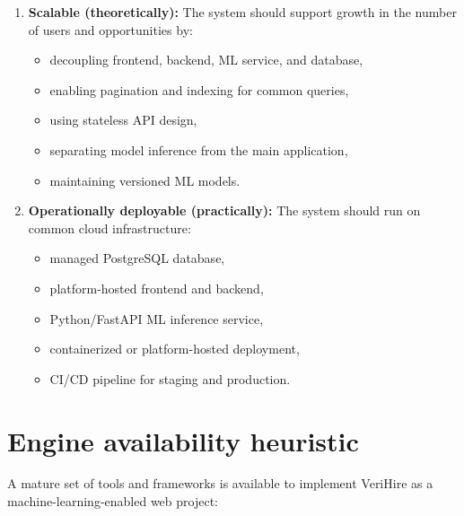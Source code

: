 \documentclass[11pt,a4paper]{article}
\begin{document}
\begin{enumerate}[leftmargin=0.7cm]

    \item \textbf{Scalable (theoretically):} The system should support growth
    in the number of users and opportunities by:

    \begin{itemize}[leftmargin=0.7cm]
        \item decoupling frontend, backend, ML service, and database,
        \item enabling pagination and indexing for common queries,
        \item using stateless API design,
        \item separating model inference from the main application,
        \item maintaining versioned ML models.
    \end{itemize}

    \item \textbf{Operationally deployable (practically):} The system should
    run on common cloud infrastructure:

    \begin{itemize}[leftmargin=0.7cm]
        \item managed PostgreSQL database,
        \item platform-hosted frontend and backend,
        \item Python/FastAPI ML inference service,
        \item containerized or platform-hosted deployment,
        \item CI/CD pipeline for staging and production.
    \end{itemize}

\end{enumerate}

\section{Engine availability heuristic}

A mature set of tools and frameworks is available to implement VeriHire as
a machine-learning-enabled web project:
\end{document}
